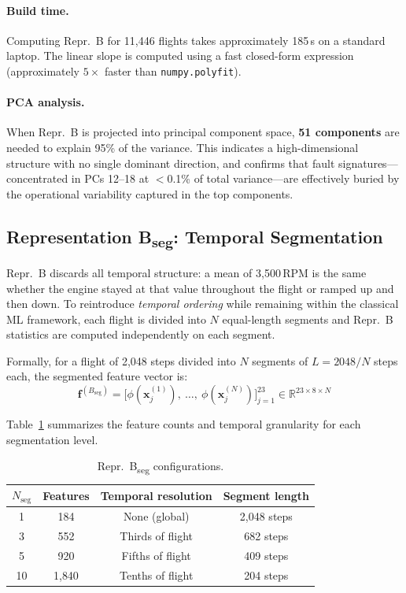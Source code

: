 \paragraph{Build time.} Computing Repr.~B for 11{,}446 flights takes
approximately 185\,s on a standard laptop. The linear slope is computed using a
fast closed-form expression (approximately $5\times$ faster than
\texttt{numpy.polyfit}).

\paragraph{PCA analysis.} When Repr.~B is projected into principal component
space, \textbf{51 components} are needed to explain 95\% of the variance. This
indicates a high-dimensional structure with no single dominant direction, and
confirms that fault signatures---concentrated in PCs 12--18 at $<$0.1\% of
total variance---are effectively buried by the operational variability captured
in the top components.

\subsection{Representation B\textsubscript{seg}: Temporal Segmentation}
\label{subsec:reprBseg}

Repr.~B discards all temporal structure: a mean of 3{,}500\,RPM is the same
whether the engine stayed at that value throughout the flight or ramped up and
then down. To reintroduce \textit{temporal ordering} while remaining within the
classical ML framework, each flight is divided into $N$ equal-length segments
and Repr.~B statistics are computed independently on each segment.

Formally, for a flight of 2{,}048 steps divided into $N$ segments of $L = 2048/N$
steps each, the segmented feature vector is:
\begin{equation}
    \mathbf{f}^{(B_{\text{seg}})} = \bigl[\phi(\mathbf{x}_j^{(1)}),\ \ldots,\
        \phi(\mathbf{x}_j^{(N)})\bigr]_{j=1}^{23}
        \in \mathbb{R}^{23 \times 8 \times N}
\end{equation}

Table~\ref{tab:reprBseg} summarizes the feature counts and temporal granularity
for each segmentation level.

\begin{table}[H]
    \centering
    \caption{Repr.~B\textsubscript{seg} configurations.}
    \label{tab:reprBseg}
    \begin{tabular}{cccc}
        \toprule
        $N_{\text{seg}}$ & \textbf{Features} & \textbf{Temporal resolution} & \textbf{Segment length} \\
        \midrule
        1  &    184 & None (global) & 2{,}048 steps \\
        3  &    552 & Thirds of flight & 682 steps \\
        5  &    920 & Fifths of flight & 409 steps \\
        10 & 1{,}840 & Tenths of flight & 204 steps \\
        \bottomrule
    \end{tabular}
\end{table}

